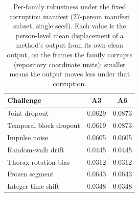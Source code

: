 \begin{table}[t]
\centering
\caption{Per-family robustness under the fixed corruption manifest (27-person
manifest subset, single seed). Each value is the person-level mean displacement
of a method's output from its own clean output, on the frames the family
corrupts (repository coordinate units); smaller means the output moves less under
that corruption.}
\label{tab:robustness-results}
\small
\begin{tabular}{l c c}
\toprule
Challenge & A3 & A6 \\
\midrule
Joint dropout & 0.0629 & 0.0873 \\
Temporal block dropout & 0.0619 & 0.0873 \\
Impulse noise & 0.0605 & 0.0605 \\
Random-walk drift & 0.0445 & 0.0445 \\
Thorax rotation bias & 0.0312 & 0.0312 \\
Frozen segment & 0.0643 & 0.0643 \\
Integer time shift & 0.0348 & 0.0348 \\
\bottomrule
\end{tabular}
\end{table}
